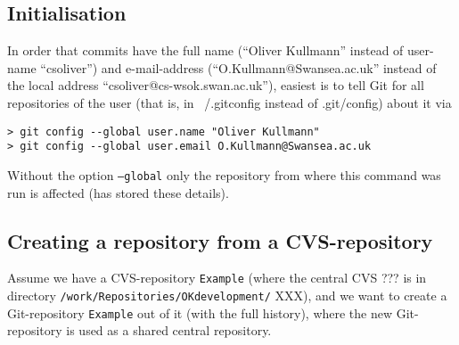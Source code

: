 \documentclass{book}
\newcommand{\filename}[1]{\texttt{#1}}
\begin{document}
\subsection{Initialisation}
\label{sec:GitInitialisation}

In order that commits have the full name (``Oliver Kullmann'' instead of user-name ``csoliver'') and e-mail-address (``O.Kullmann@Swansea.ac.uk'' instead of the local address ``csoliver@cs-wsok.swan.ac.uk''), easiest is to tell Git for all repositories of the user (that is, in  ~/.gitconfig instead of .git/config) about it via
\begin{verbatim}
> git config --global user.name "Oliver Kullmann"
> git config --global user.email O.Kullmann@Swansea.ac.uk
\end{verbatim}
Without the option \texttt{--global} only the repository from where this command was run is affected (has stored these details).





\subsection{Creating a repository from a CVS-repository}
\label{sec:CVStoGit}

Assume we have a CVS-repository \texttt{Example} (where the central CVS ??? is in directory \filename{/work/Repositories/OKdevelopment/} XXX), and we want to create a Git-repository \texttt{Example} out of it (with the full history), where the new Git-repository is used as a shared central repository.
\end{document}
